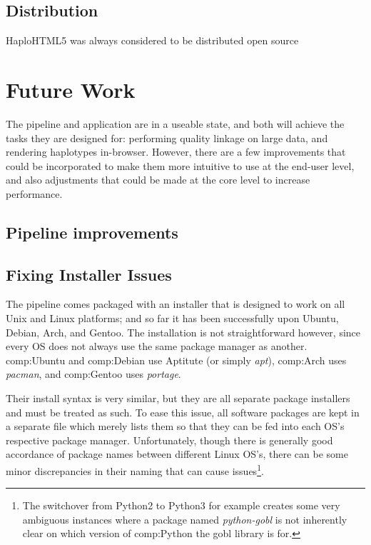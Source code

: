 \subsection{Distribution}

HaploHTML5 was always considered to be distributed open source


\section{Future Work}

The pipeline and application are in a useable state, and both will achieve the tasks they are designed for: performing quality linkage on large data, and rendering haplotypes in-browser. However, there are a few improvements that could be incorporated to make them more intuitive to use at the end-user level, and also adjustments that could be made at the core level to increase performance.

\subsection{Pipeline improvements}

\subsection{Fixing Installer Issues}

The pipeline comes packaged with an installer that is designed to work on all Unix and Linux platforms; and so far it has been successfully upon Ubuntu, Debian, Arch, and Gentoo. The installation is not straightforward however, since every OS does not always use the same package manager as another. \gls{comp:Ubuntu} and \gls{comp:Debian} use Aptitute (or simply \textit{apt}), \gls{comp:Arch} uses \textit{pacman}, and \gls{comp:Gentoo} uses \textit{portage}.

Their install syntax is very similar, but they are all separate package installers and must be treated as such. To ease this issue, all software packages are kept in a separate file which merely lists them so that they can be fed into each OS's respective package manager. Unfortunately, though there is generally good accordance of package names between different Linux OS's, there can be some minor discrepancies in their naming that can cause issues\footnote{The switchover from Python2 to Python3 for example creates some very ambiguous instances where a package named \textit{python-gobl} is not inherently clear on which version of \gls{comp:Python} the gobl library is for.}.

